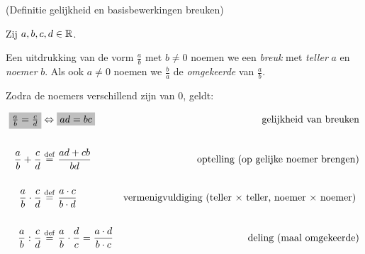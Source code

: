 \documentclass[numbers]{ximera}
\begin{document}
\begin{definition} (Definitie gelijkheid en basisbewerkingen breuken)
	
Zij $a,b,c,d\in \mathbb{R}$. 

Een uitdrukking van de vorm $\frac ab$ met $b\neq0$ noemen we een \textit{breuk} met \textit{teller} $a$ en \textit{noemer} $b$. Als ook $a\neq0$ noemen we $\frac ba$ de \textit{omgekeerde} van $\frac ab$. 

Zodra de noemers verschillend zijn van $0$, geldt:

\begin{align*}
		\important{\frac{a}{b} = \frac{c}{d}}  &\iff \important{ad = bc} 
			& \textrm{gelijkheid van breuken} \\ \\
		\frac{a}{b}+\frac{c}{d} &\perdef \frac{ad+cb}{bd} 
			& \textrm{ optelling (op gelijke noemer brengen)} \\ \\
		\frac{a}{b} \cdot \frac{c}{d} &\perdef \frac{a\cdot c}{b\cdot d} 
			& \textrm{vermenigvuldiging (teller $\times$ teller, noemer $\times$ noemer) } \\ \\%
		\frac{a}{b} : \frac{c}{d} &\perdef \frac ab \cdot \frac dc = \frac{a\cdot d}{b\cdot c} 
		& \textrm{deling (maal omgekeerde)} \\
\end{align*}

\end{definition}
\end{document}
